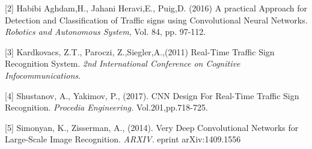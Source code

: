\documentclass{article}
\begin{document}
[2] Habibi Aghdam,H., Jahani Heravi,E., Puig,D. (2016) A practical Approach for Detection and Classification of Traffic signs using Convolutional Neural Networks. {\it Robotics and Autonomous System}, Vol. 84, pp. 97-112.

[3] Kardkovacs, Z.T., Paroczi, Z.,Siegler,A.,(2011) Real-Time Traffic Sign Recognition System. {\it 2nd International Conference on Cognitive Infocommunications.}

[4] Shustanov, A., Yakimov, P., (2017). CNN Design For Real-Time Traffic Sign Recognition. {\it Procedia Engineering.} Vol.201,pp.718-725.

[5] Simonyan, K., Zisserman, A., (2014). Very Deep Convolutional Networks for Large-Scale Image Recognition. {\it ARXIV.} eprint arXiv:1409.1556


\end{document}
